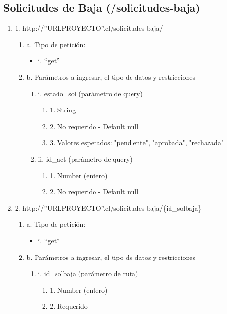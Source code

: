 \subsection{Solicitudes de Baja (/solicitudes-baja)}

\begin{enumerate}
    \item 1. http://”URLPROYECTO”.cl/solicitudes-baja/
    \begin{enumerate}
        \item a. Tipo de petición:
            \begin{itemize}
               \item i. “get”
            \end{itemize}
        \item b. Parámetros a ingresar, el tipo de datos y restricciones
            \begin{enumerate}
                \item i. estado\_sol (parámetro de query)
                    \begin{enumerate}
                        \item 1. String
                        \item 2. No requerido - Default null
                        \item 3. Valores esperados: "pendiente", "aprobada", "rechazada"
                    \end{enumerate}
                \item ii. id\_act (parámetro de query)
                    \begin{enumerate}
                        \item 1. Number (entero)
                        \item 2. No requerido - Default null
                    \end{enumerate}
            \end{enumerate}
    \end{enumerate}

    \item 2. http://”URLPROYECTO”.cl/solicitudes-baja/\{id\_solbaja\}
    \begin{enumerate}
        \item a. Tipo de petición:
            \begin{itemize}
               \item i. “get”
            \end{itemize}
        \item b. Parámetros a ingresar, el tipo de datos y restricciones
            \begin{enumerate}
                \item i. id\_solbaja (parámetro de ruta)
                    \begin{enumerate}
                        \item 1. Number (entero)
                        \item 2. Requerido
                    \end{enumerate}
            \end{enumerate}
    \end{enumerate}


\end{enumerate}
